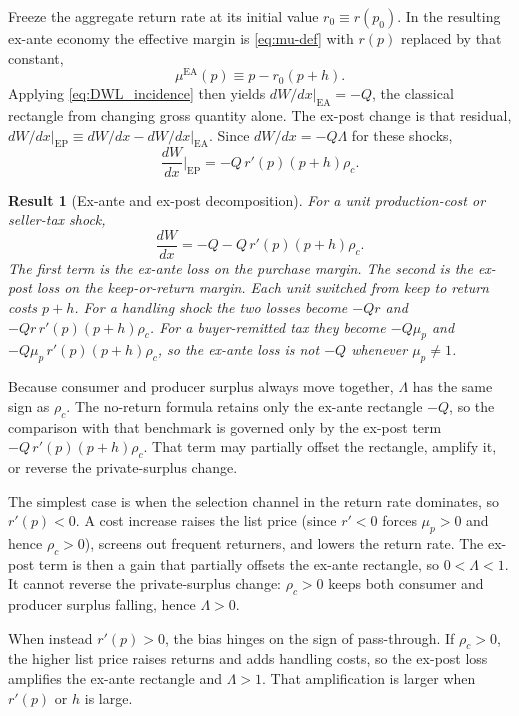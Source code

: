 \documentclass[11pt]{article}
\newtheorem{result}{Result}
\begin{document}
Freeze the aggregate return rate at its initial value $r_0\equiv r(p_0)$.
In the resulting ex-ante economy the effective margin is
\eqref{eq:mu-def} with $r(p)$ replaced by that constant,
\begin{equation}
  \mu^{\mathrm{EA}}(p)\equiv p-r_0(p+h).
  \label{eq:mu-EA}
\end{equation}
Applying \eqref{eq:DWL_incidence} then yields
$dW/dx\big|_{\mathrm{EA}}=-Q$, the classical rectangle from changing gross
quantity alone.  The ex-post change is that residual,
$dW/dx\big|_{\mathrm{EP}}\equiv dW/dx-dW/dx\big|_{\mathrm{EA}}$.  Since
$dW/dx=-Q\Lambda$ for these shocks,
\begin{equation}
  \frac{dW}{dx}\Big|_{\mathrm{EP}}
  =-Q\,r'(p)(p+h)\rho_c.
  \label{eq:DWL-EP}
\end{equation}
\begin{result}[Ex-ante and ex-post decomposition]
\label{res:EA-EP}
  For a unit production-cost or seller-tax shock,
  \begin{equation}
    \frac{dW}{dx}
    =-Q
    -Q\,r'(p)(p+h)\rho_c.
    \label{eq:DWL-decomp}
  \end{equation}
  The first term is the ex-ante loss on the purchase margin.  The second is
  the ex-post loss on the keep-or-return margin.  Each unit switched from keep
  to return costs $p+h$.  For a handling shock the two losses become $-Qr$ and
  $-Qr\,r'(p)(p+h)\rho_c$.  For a buyer-remitted tax they become $-Q\mu_p$ and
  $-Q\mu_p\,r'(p)(p+h)\rho_c$, so the ex-ante loss is not $-Q$ whenever
  $\mu_p\neq 1$.
\end{result}
Because consumer and producer surplus always move together, $\Lambda$ has the
same sign as $\rho_c$.  The no-return formula retains only the ex-ante
rectangle $-Q$, so the comparison with that benchmark is governed only by the
ex-post term $-Q\,r'(p)(p+h)\rho_c$.  That term may partially offset the
rectangle, amplify it, or reverse the private-surplus change.

The simplest case is when the selection channel in the return rate
dominates, so $r'(p)<0$.  A cost increase raises the list price (since
$r'<0$ forces $\mu_p>0$ and hence $\rho_c>0$), screens out frequent
returners, and lowers the return rate.  The ex-post term is then a gain that
partially offsets the ex-ante rectangle, so $0<\Lambda<1$.  It cannot reverse
the private-surplus change: $\rho_c>0$ keeps both consumer and producer
surplus falling, hence $\Lambda>0$.

When instead $r'(p)>0$, the bias hinges on the sign of pass-through.  If
$\rho_c>0$, the higher list price raises returns and adds handling costs, so
the ex-post loss amplifies the ex-ante rectangle and $\Lambda>1$.  That
amplification is larger when $r'(p)$ or $h$ is large.
\end{document}
